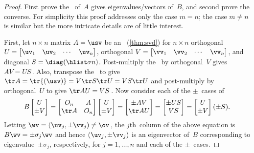 \begin{proof} 
First prove the \svd\ of~\(A\) gives eigenvalues\slash vectors of~\(B\), and second prove the converse.
For simplicity this proof addresses only the case \(m=n\); the case \(m\neq n\) is similar but the more intricate details are of little interest.

First, let \(n\times n\) matrix \(A=\usv\) be an \svd\ (\autoref{thm:svd}) for \(n\times n\) orthogonal \(U=\begin{bmatrix} \uv_1&\uv_2&\cdots&\uv_n \end{bmatrix}\),  orthogonal \(V=\begin{bmatrix} \vv_1&\vv_2&\cdots&\vv_n \end{bmatrix}\), and diagonal \(S=\diag(\hlist\sigma n)\).
Post-multiply the \svd\ by orthogonal~\(V\) gives \(AV=US\)\,.
Also, transpose the \svd\ to give \(\tr A=\tr{(\usv)}=V\tr S\tr U=VS\tr U\) and post-multiply by orthogonal~\(U\) to give \(\tr AU=VS\)\,.
Now consider each of the \(\pm\)~cases of
\begin{equation*}
B\begin{bmatrix} U\\\pm V \end{bmatrix}
=\begin{bmatrix} O_n&A\\\tr A&O_n \end{bmatrix}\begin{bmatrix} U\\\pm V \end{bmatrix}
=\begin{bmatrix} \pm AV\\\tr AU \end{bmatrix}
=\begin{bmatrix} \pm US\\VS \end{bmatrix}
=\begin{bmatrix} U\\\pm V \end{bmatrix}(\pm S).
\end{equation*}
Letting \(\wv=(\uv_j,\pm\vv_j)\neq\ov\)\,, the \(j\)th~column of the above equation is \(B\wv=\pm\sigma_j\wv\) and hence \((\uv_j,\pm\vv_j)\) is an eigenvector of~\(B\) corresponding to eigenvalue~\(\pm\sigma_j\), respectively, for \(j=1,\ldots,n\) and each of the \(\pm\)~cases.


\end{proof}
